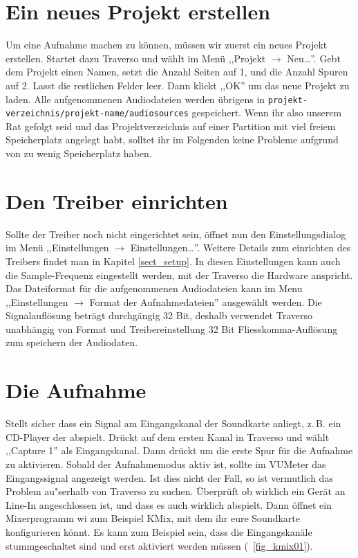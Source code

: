 \section{Ein neues Projekt erstellen}
Um eine Aufnahme machen zu können, müssen wir zuerst ein neues Projekt erstellen. Startet dazu Traverso und wählt im Menü ,,Projekt $\rightarrow$ Neu\dots''. Gebt dem Projekt einen Namen, setzt die Anzahl Seiten auf 1, und die Anzahl Spuren auf 2. Lasst die restlichen Felder leer. Dann klickt ,,OK'' um das neue Projekt zu laden. Alle aufgenommenen Audiodateien werden übrigens in \texttt{projekt-verzeichnis/projekt-name/audiosources} gespeichert. Wenn ihr also unserem Rat gefolgt seid und das Projektverzeichnis auf einer Partition mit viel freiem Speicherplatz angelegt habt, solltet ihr im Folgenden keine Probleme aufgrund von zu wenig Speicherplatz haben.

\section{Den Treiber einrichten}
Sollte der Treiber noch nicht eingerichtet sein, öffnet nun den Einstellungsdialog im Menü ,,Einstellungen $\rightarrow$ Einstellungen\dots''. Weitere Details zum einrichten des Treibers findet man in Kapitel \ref{sect_setup}. In diesen Einstellungen kann auch die Sample-Frequenz eingestellt werden, mit der Traverso die Hardware anspricht. Das Dateiformat für die aufgenommenen Audiodateien kann im Menu ,,Einstellungen $\rightarrow$ Format der Aufnahmedateien'' ausgewählt werden. Die Signalauflösung beträgt durchgängig 32 Bit, deshalb verwendet Traverso unabhängig von Format und Treibereinstellung 32 Bit Fliesskomma-Auflösung zum speichern der Audiodaten.

\section{Die Aufnahme}
Stellt sicher dass ein Signal am Eingangskanal der Soundkarte anliegt, z.\,B. ein CD-Player der abspielt. Drückt  auf dem ersten Kanal in Traverso und wählt ,,Capture 1'' als Eingangskanal. Dann drückt  um die erste Spur für die Aufnahme zu aktivieren. Sobald der Aufnahmemodus aktiv ist, sollte im VUMeter das Eingangssignal angezeigt werden. Ist dies nicht der Fall, so ist vermutlich das Problem au"serhalb von Traverso zu suchen. Überprüft ob wirklich ein Gerät an Line-In angeschlossen ist, und dass es auch wirklich abspielt. Dann öffnet ein Mixerprogramm wi zum Beispiel KMix, mit dem ihr eure Soundkarte konfigurieren könnt. Es kann zum Beispiel sein, dass die Eingangskanäle stummgeschaltet sind und erst aktiviert werden müssen (\FigB\ \ref{fig_kmix01}).

